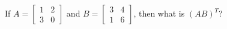 
%
%
%
%
% 
% 

\question[2] If $A = \left[ \begin{array}{cc} 
1 & 2 \\ 
3 & 0
\end{array}\right]$ and 
$B = \left[ \begin{array}{cc}
3 & 4 \\
1 & 6
\end{array} \right]$, then what is $(AB)^{T}$?


\ifprintanswers
\fi 


